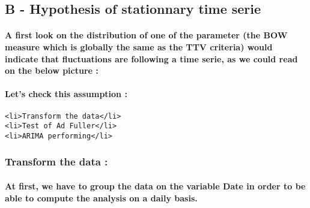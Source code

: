 \documentclass[11pt]{article}
\begin{document}
    \subsection{B - Hypothesis of stationnary time
serie}\label{b---hypothesis-of-stationnary-time-serie}

    \paragraph{A first look on the distribution of one of the parameter (the
BOW measure which is globally the same as the TTV criteria) would
indicate that fluctuations are following a time serie, as we could read
on the below picture
:}\label{a-first-look-on-the-distribution-of-one-of-the-parameter-the-bow-measure-which-is-globally-the-same-as-the-ttv-criteria-would-indicate-that-fluctuations-are-following-a-time-serie-as-we-could-read-on-the-below-picture}

\paragraph{Let's check this assumption
:}\label{lets-check-this-assumption}

\begin{verbatim}
<li>Transform the data</li>
<li>Test of Ad Fuller</li>
<li>ARIMA performing</li>
\end{verbatim}

    \subsubsection{Transform the data :}\label{transform-the-data}

    \paragraph{At first, we have to group the data on the variable Date in
order to be able to compute the analysis on a daily
basis.}\label{at-first-we-have-to-group-the-data-on-the-variable-date-in-order-to-be-able-to-compute-the-analysis-on-a-daily-basis.}
\end{document}
